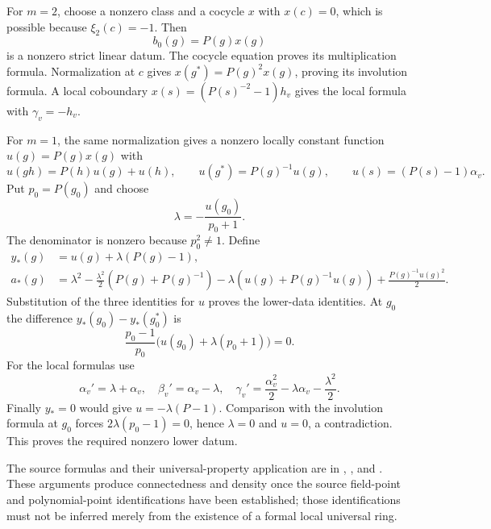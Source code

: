 For $m=2$, choose a nonzero class and a cocycle $x$ with $x(c)=0$,
which is possible because $\xi_2(c)=-1$.
Then
\[
                         b_0(g)=P(g)x(g)
\]
is a nonzero strict linear datum.
The cocycle equation proves its multiplication formula.
Normalization at $c$ gives
$x(g^*)=P(g)^2x(g)$, proving its involution formula.
A local coboundary $x(s)=(P(s)^{-2}-1)h_v$ gives the local formula
with $\gamma_v=-h_v$.

For $m=1$, the same normalization gives a nonzero locally constant
function $u(g)=P(g)x(g)$ with
\[
 u(gh)=P(h)u(g)+u(h),\qquad
 u(g^*)=P(g)^{-1}u(g),\qquad
 u(s)=(P(s)-1)\alpha_v.
\]
Put $p_0=P(g_0)$ and choose
\[
                 \lambda=-\frac{u(g_0)}{p_0+1}.
\]
The denominator is nonzero because $p_0^2\ne1$.
Define
\[
 \begin{split}
 y_*(g)&=u(g)+\lambda(P(g)-1),\\
 a_*(g)&=\lambda^2
   -\frac{\lambda^2}{2}(P(g)+P(g)^{-1})
   -\lambda(u(g)+P(g)^{-1}u(g))
   +\frac{P(g)^{-1}u(g)^2}{2}.
 \end{split}
\]
Substitution of the three identities for $u$ proves the lower-data
identities. At $g_0$ the difference
$y_*(g_0)-y_*(g_0^*)$ is
\[
       \frac{p_0-1}{p_0}
                  \bigl(u(g_0)+\lambda(p_0+1)\bigr)=0.
\]
For the local formulas use
\[
 \alpha_v'=\lambda+\alpha_v,\quad
 \beta_v'=\alpha_v-\lambda,\quad
 \gamma_v'=\frac{\alpha_v^2}{2}
                         -\lambda\alpha_v-\frac{\lambda^2}{2}.
\]
Finally $y_*=0$ would give $u=-\lambda(P-1)$.
Comparison with the involution formula at $g_0$ forces
$2\lambda(p_0-1)=0$, hence $\lambda=0$ and $u=0$, a contradiction.
This proves the required nonzero lower datum.

The source formulas and their universal-property application are in
\href{https://github.com/ChristianKudeba/alpoge-rh-verification/blob/alpoge-source-7cbf7a0c/src/Development/AutomorphicArithmetic/AutomorphicVarieties/FrobeniusSmoothVectors/StrSMul.lean}
{},
\href{https://github.com/ChristianKudeba/alpoge-rh-verification/blob/alpoge-source-7cbf7a0c/src/Development/AutomorphicArithmetic/AutomorphicVarieties/FrobeniusSmoothVectors/ExistsNonzeroLowCocycle.lean}
{}, and
\href{https://github.com/ChristianKudeba/alpoge-rh-verification/blob/alpoge-source-7cbf7a0c/src/Development/AutomorphicArithmetic/AutomorphicVarieties/FrobeniusSmoothVectors/ExistsNonzeroLowCocycle.lean}
{}.
These arguments produce connectedness and density once the source
field-point and polynomial-point identifications have been established;
those identifications must not be inferred merely from the existence
of a formal local universal ring.

